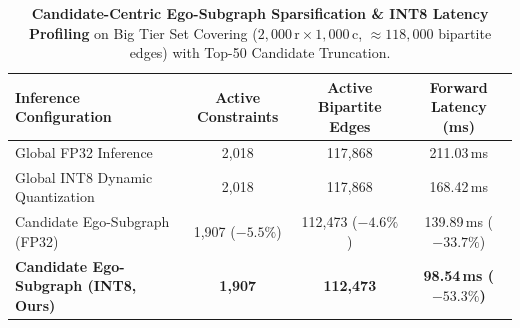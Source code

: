 \begin{table}[t]
\centering
\caption{\textbf{Candidate-Centric Ego-Subgraph Sparsification & INT8 Latency Profiling} on Big Tier Set Covering ($2,000\,\text{r} \times 1,000\,\text{c}$, $\approx 118,000$ bipartite edges) with Top-50 Candidate Truncation.}
\label{tab:latency_profile}
\small
\begin{tabular}{lccc}
\toprule
\textbf{Inference Configuration} & \textbf{Active Constraints} & \textbf{Active Bipartite Edges} & \textbf{Forward Latency (ms)} \\
\midrule
Global FP32 Inference & 2,018 & 117,868 & 211.03\,ms \\
Global INT8 Dynamic Quantization & 2,018 & 117,868 & 168.42\,ms \\
Candidate Ego-Subgraph (FP32) & 1,907 ($-5.5\%$) & 112,473 ($-4.6\%$) & 139.89\,ms ($-33.7\%$) \\
\textbf{Candidate Ego-Subgraph (INT8, Ours)} & \textbf{1,907} & \textbf{112,473} & \textbf{98.54\,ms ($-53.3\%$)} \\
\bottomrule
\end{tabular}
\end{table}
